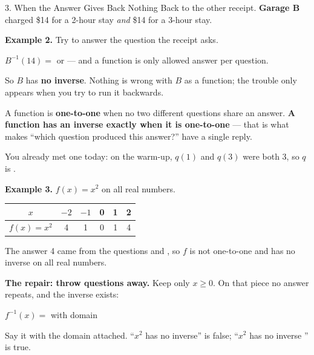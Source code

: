 \documentclass[10pt]{article}
\begin{document}
\boxguard[26]
\begin{notesbox}{3. When the Answer Gives Back Nothing}
Back to the other receipt. \textbf{Garage B} charged \$14 for a 2-hour stay
\textit{and} \$14 for a 3-hour stay.

\smallskip
\textbf{Example 2.} Try to answer the question the receipt asks.

\smallskip
$B^{-1}(14) = $  \; or \;  --- and a function is
only allowed  answer per question.

\smallskip
So $B$ has \textbf{no inverse}. Nothing is wrong with $B$ as a function; the
trouble only appears when you try to run it backwards.

\medskip
\begin{center}
\begin{tcolorbox}[colback=lilac, colframe=plum, boxrule=0.8pt, arc=2mm,
    left=3mm, right=3mm, top=2mm, bottom=2mm, width=0.94\linewidth]
A function is \textbf{one-to-one} when no two different questions share an
answer. \textbf{A function has an inverse exactly when it is one-to-one} ---
that is what makes ``which question produced this answer?'' have a single
reply.
\end{tcolorbox}
\end{center}

\smallskip
You already met one today: on the warm-up, $q(1)$ and $q(3)$ were both 3, so
$q$ is .

\medskip
\textbf{Example 3.} $f(x) = x^2$ on all real numbers.

\smallskip
\renewcommand{\arraystretch}{1.4}
\begin{center}
\begin{tabular}{|c|c|c|c|c|c|}
\hline
$x$ & $-2$ & $-1$ & 0 & 1 & 2 \\
\hline
$f(x) = x^2$ & 4 & 1 & 0 & 1 & 4 \\
\hline
\end{tabular}
\end{center}

\smallskip
The answer 4 came from the questions  and , so $f$ is
not one-to-one and has no inverse on all real numbers.

\medskip
\textbf{The repair: throw questions away.} Keep only $x \ge 0$. On that piece
no answer repeats, and the inverse exists:

\begin{center}
$f^{-1}(x) = $  \qquad with domain 
\end{center}

\smallskip
Say it with the domain attached. ``$x^2$ has no inverse'' is false;
``$x^2$ has no inverse '' is true.
\end{notesbox}
\end{document}
